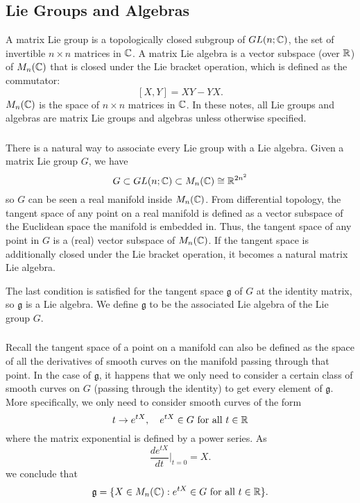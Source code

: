 \subsection{Lie Groups and Algebras}
A matrix Lie group is a topologically closed subgroup of $GL(n; {\mathbb C})$, the set of invertible $n \times n$ matrices in ${\mathbb C}$. A matrix Lie algebra is a vector subspace (over ${\mathbb R}$) of $M_n({\mathbb C})$ that is closed under the Lie bracket operation, which is defined as the commutator:
\[
    [X, Y] = XY - YX.
\]
$M_n({\mathbb C})$ is the space of $n \times n$ matrices in ${\mathbb C}$. In these notes, all Lie groups and algebras are matrix Lie groups and algebras unless otherwise specified.

\subsubsection{}
There is a natural way to associate every Lie group with a Lie algebra. Given a matrix Lie group $G$, we have
\[
    G \subset GL(n; {\mathbb C}) \subset M_n({\mathbb C}) \cong {\mathbb R}^{2n^2}
\]
so $G$ can be seen a real manifold inside $M_n({\mathbb C})$. From differential topology, the tangent space of any point on a real manifold is defined as a vector subspace of the Euclidean space the manifold is embedded in. Thus, the tangent space of any point in $G$ is a (real) vector subspace of $M_n({\mathbb C})$. If the tangent space is additionally closed under the Lie bracket operation, it becomes a natural matrix Lie algebra.

The last condition is satisfied for the tangent space $\mathfrak g$ of $G$ at the identity matrix, so $\mathfrak g$ is a Lie algebra. We define $\mathfrak g$ to be the associated Lie algebra of the Lie group $G$.

\subsubsection{}
Recall the tangent space of a point on a manifold can also be defined as the space of all the derivatives of smooth curves on the manifold passing through that point. In the case of $\mathfrak g$, it happens that we only need to consider a certain class of smooth curves on $G$ (passing through the identity) to get every element of $\mathfrak g$. More specifically, we only need to consider smooth curves of the form
\[
    t \rightarrow e^{tX}, \quad e^{tX} \in G \text{ for all } t \in {\mathbb R}
\]
where the matrix exponential is defined by a power series. As
\[
    \frac{d e^{tX}}{dt} \Bigr|_{t = 0} = X.
\]
we conclude that
\[
    \mathfrak g = \{X \in M_n({\mathbb C}) : e^{tX} \in G \text{ for all } t \in {\mathbb R}\}.
\]

